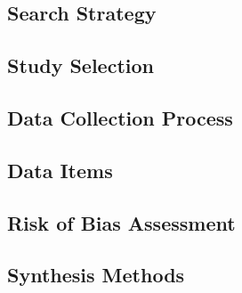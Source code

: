 
\subsection{Search Strategy}\label{sec:search}


\subsection{Study Selection}\label{sec:selection}


\subsection{Data Collection Process}\label{sec:data-collection}


\subsection{Data Items}\label{sec:data-items}


\subsection{Risk of Bias Assessment}\label{sec:rob}


\subsection{Synthesis Methods}\label{sec:synthesis-methods}

